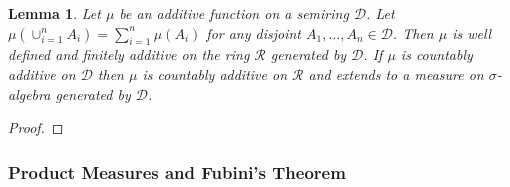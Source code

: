 \documentclass{amsart}
\newtheorem{lem}[thm]{Lemma}
\theoremstyle{remark}
\theoremstyle{definition}
\begin{document}
\begin{lem}Let $\mu$ be an additive function on a semiring $\mathcal{D}$.  Let
  $\mu(\cup_{i=1}^n A_i) = \sum_{i=1}^n \mu(A_i)$ for any disjoint
  $A_1, \dotsc, A_n \in \mathcal{D}$.  Then $\mu$ is well defined and
  finitely additive on
  the ring $\mathcal{R}$ generated by $\mathcal{D}$.  If $\mu$ is
  countably additive on $\mathcal{D}$ then $\mu$ is countably additive
  on $\mathcal{R}$ and extends to a measure on $\sigma$-algebra
  generated by $\mathcal{D}$.
\end{lem}
\begin{proof}
\end{proof}

\subsubsection{Product Measures and Fubini's Theorem}
\end{document}
